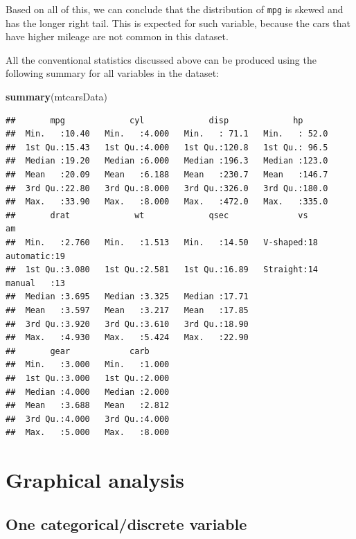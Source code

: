 \documentclass[
]{book}
\newenvironment{Shaded}{\begin{snugshade}}{\end{snugshade}}
\newcommand{\KeywordTok}[1]{\textcolor[rgb]{0.13,0.29,0.53}{\textbf{#1}}}
\newcommand{\NormalTok}[1]{#1}
\theoremstyle{definition}
\theoremstyle{definition}
\theoremstyle{definition}
\theoremstyle{definition}
\theoremstyle{remark}
\begin{document}
Based on all of this, we can conclude that the distribution of \texttt{mpg} is skewed and has the longer right tail. This is expected for such variable, because the cars that have higher mileage are not common in this dataset.

All the conventional statistics discussed above can be produced using the following summary for all variables in the dataset:

\begin{Shaded}
\begin{Highlighting}[]
\KeywordTok{summary}\NormalTok{(mtcarsData)}
\end{Highlighting}
\end{Shaded}

\begin{verbatim}
##       mpg             cyl             disp             hp       
##  Min.   :10.40   Min.   :4.000   Min.   : 71.1   Min.   : 52.0  
##  1st Qu.:15.43   1st Qu.:4.000   1st Qu.:120.8   1st Qu.: 96.5  
##  Median :19.20   Median :6.000   Median :196.3   Median :123.0  
##  Mean   :20.09   Mean   :6.188   Mean   :230.7   Mean   :146.7  
##  3rd Qu.:22.80   3rd Qu.:8.000   3rd Qu.:326.0   3rd Qu.:180.0  
##  Max.   :33.90   Max.   :8.000   Max.   :472.0   Max.   :335.0  
##       drat             wt             qsec              vs             am    
##  Min.   :2.760   Min.   :1.513   Min.   :14.50   V-shaped:18   automatic:19  
##  1st Qu.:3.080   1st Qu.:2.581   1st Qu.:16.89   Straight:14   manual   :13  
##  Median :3.695   Median :3.325   Median :17.71                               
##  Mean   :3.597   Mean   :3.217   Mean   :17.85                               
##  3rd Qu.:3.920   3rd Qu.:3.610   3rd Qu.:18.90                               
##  Max.   :4.930   Max.   :5.424   Max.   :22.90                               
##       gear            carb      
##  Min.   :3.000   Min.   :1.000  
##  1st Qu.:3.000   1st Qu.:2.000  
##  Median :4.000   Median :2.000  
##  Mean   :3.688   Mean   :2.812  
##  3rd Qu.:4.000   3rd Qu.:4.000  
##  Max.   :5.000   Max.   :8.000
\end{verbatim}

\hypertarget{dataAnalysisGraphical}{%
\section{Graphical analysis}\label{dataAnalysisGraphical}}

\hypertarget{one-categoricaldiscrete-variable}{%
\subsection{One categorical/discrete variable}\label{one-categoricaldiscrete-variable}}
\end{document}

